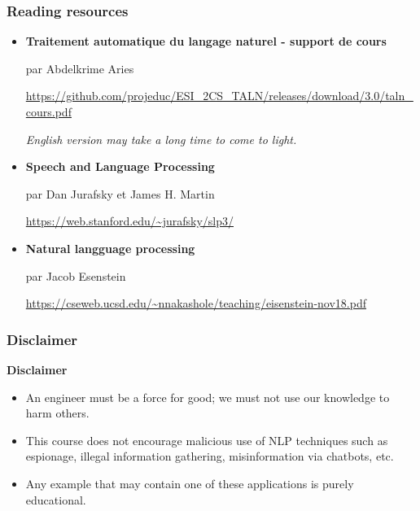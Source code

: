 \documentclass{beamer}
\begin{document}
\begin{frame}
	\frametitle{Reading resources}
	
	\begin{itemize}
		
		\item \textbf{Traitement automatique du langage naturel - support de cours}
		
		par Abdelkrime Aries
		
		\url{https://github.com/projeduc/ESI_2CS_TALN/releases/download/3.0/taln_cours.pdf}
		
		\textit{\color{red}English version may take a long time to come to light.}
		
		\item \textbf{Speech and Language Processing} 
		
		par Dan Jurafsky et James H. Martin
		
		\url{https://web.stanford.edu/~jurafsky/slp3/}
		
		\item \textbf{Natural langguage processing}
		
		par Jacob Esenstein 
		
		\url{https://cseweb.ucsd.edu/~nnakashole/teaching/eisenstein-nov18.pdf}
		
		
	\end{itemize}
	
\end{frame}

\begin{frame}
	\frametitle{Disclaimer}
	
	\begin{tcolorbox}[colback=red,
		colframe=red,  
		arc=0pt,outer arc=0pt,
		valign=top, 
		halign=center,
		width=\textwidth]
		
		\color{white}
		{\bfseries Disclaimer}
		
	\end{tcolorbox}\vspace{-.5cm}
	\begin{tcolorbox}[colback=my-grey,
		colframe=my-grey,  
		center, arc=0pt,outer arc=0pt,
		valign=top, 
		halign=left,
		width=\textwidth]
		
		\begin{itemize}
			\item An engineer must be a force for good; we must not use our knowledge to harm others.
			\item This course does not encourage malicious use of NLP techniques such as espionage, illegal information gathering, misinformation via chatbots, etc.
			\item Any example that may contain one of these applications is purely educational.	
		\end{itemize}
		
	\end{tcolorbox}
	
\end{frame}
\end{document}
